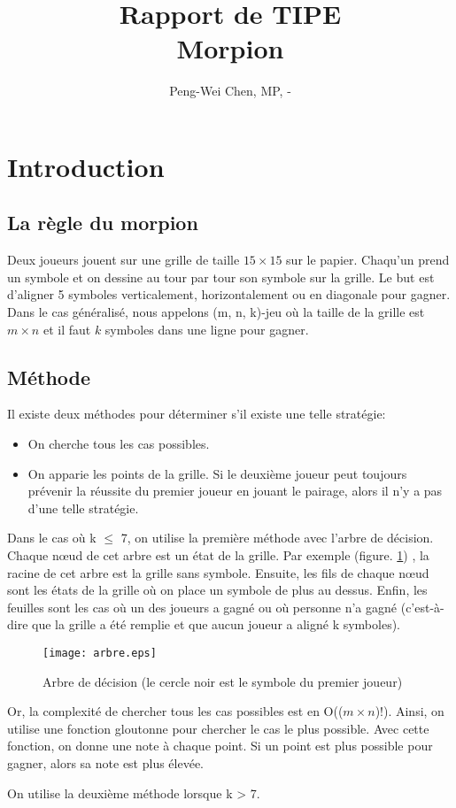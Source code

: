 \documentclass[12pt, a4paper]{article}
\title{Rapport de TIPE\\
Morpion}
\author{Peng-Wei Chen, MP, \oldstylenums{2017}-\oldstylenums{2018}}
\begin{document}
\maketitle

\section{Introduction}
\subsection{La règle du morpion}
Deux joueurs jouent sur une grille de taille $15 \times 15$ sur le papier. Chaqu'un prend un symbole et on dessine au tour par tour son symbole sur la grille. Le but est d'aligner 5 symboles verticalement, horizontalement ou en diagonale pour gagner.
Dans le cas généralisé, nous appelons (m, n, k)-jeu où la taille de la grille est $m \times n$ et il faut $k$ symboles dans une ligne pour gagner.
\subsection{Méthode}
Il existe deux méthodes pour déterminer s'il existe une telle stratégie:
\begin{itemize}
    \item On cherche tous les cas possibles.
    \item On apparie les points de la grille. Si le deuxième joueur peut toujours prévenir la réussite du premier joueur en jouant le pairage, alors il n'y a pas d'une telle stratégie.
\end{itemize}

Dans le cas où k $\le$ 7, on utilise la première méthode avec l'arbre de décision. Chaque nœud de cet arbre est un état de la grille. Par exemple (figure. \ref{fig:arbre}) , la racine de cet arbre est la grille sans symbole. Ensuite, les fils de chaque nœud sont les états de la grille où on place un symbole de plus au dessus. Enfin, les feuilles sont les cas où un des joueurs a gagné ou où personne n'a gagné (c'est-à-dire que la grille a été remplie et que aucun joueur a aligné k symboles).

\begin{figure}[t]
\centering
\texttt{[image: arbre.eps]}
\caption{Arbre de décision (le cercle noir est le symbole du premier joueur)} \label{fig:arbre}
\end{figure}

Or, la complexité de chercher tous les cas possibles est en O(($m \times n$)!). Ainsi, on utilise une fonction gloutonne pour chercher le cas le \og plus \fg possible. Avec cette fonction, on donne une note à chaque point. Si un point est plus possible pour gagner, alors sa note est plus élevée.\par
On utilise la deuxième méthode lorsque k > 7.
\end{document}
